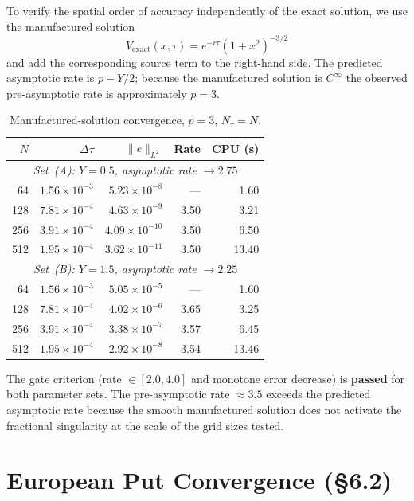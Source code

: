 \documentclass[11pt,a4paper]{article}
\begin{document}
To verify the spatial order of accuracy independently of the exact solution,
we use the manufactured solution
\[
  V_{\mathrm{exact}}(x,\tau) = e^{-r\tau}(1+x^2)^{-3/2}
\]
and add the corresponding source term to the right-hand side.
The predicted asymptotic rate is $p - Y/2$; because the manufactured solution
is $C^\infty$ the observed pre-asymptotic rate is approximately $p = 3$.

\begin{table}[ht]
\centering
\caption{Manufactured-solution convergence, $p=3$, $N_\tau = N$.}
\label{tab:manufactured}
\begin{tabular}{rrrrr}
\toprule
$N$ & $\Delta\tau$ & $\|e\|_{L^2}$ & Rate & CPU (s) \\
\midrule
\multicolumn{5}{c}{\textit{Set~(A): $Y=0.5$, asymptotic rate $\to 2.75$}} \\[2pt]
 64  & $1.56\times10^{-3}$ & $5.23\times10^{-8}$  & ---  & 1.60 \\
128  & $7.81\times10^{-4}$ & $4.63\times10^{-9}$  & 3.50 & 3.21 \\
256  & $3.91\times10^{-4}$ & $4.09\times10^{-10}$ & 3.50 & 6.50 \\
512  & $1.95\times10^{-4}$ & $3.62\times10^{-11}$ & 3.50 & 13.40 \\
\midrule
\multicolumn{5}{c}{\textit{Set~(B): $Y=1.5$, asymptotic rate $\to 2.25$}} \\[2pt]
 64  & $1.56\times10^{-3}$ & $5.05\times10^{-5}$  & ---  & 1.60 \\
128  & $7.81\times10^{-4}$ & $4.02\times10^{-6}$  & 3.65 & 3.25 \\
256  & $3.91\times10^{-4}$ & $3.38\times10^{-7}$  & 3.57 & 6.45 \\
512  & $1.95\times10^{-4}$ & $2.92\times10^{-8}$  & 3.54 & 13.46 \\
\bottomrule
\end{tabular}
\end{table}

The gate criterion (rate $\in[2.0,4.0]$ and monotone error decrease) is
\textbf{passed} for both parameter sets.
The pre-asymptotic rate $\approx 3.5$ exceeds the predicted asymptotic rate
because the smooth manufactured solution does not activate the fractional
singularity at the scale of the grid sizes tested.

\section{European Put Convergence (\S6.2)}
\end{document}
